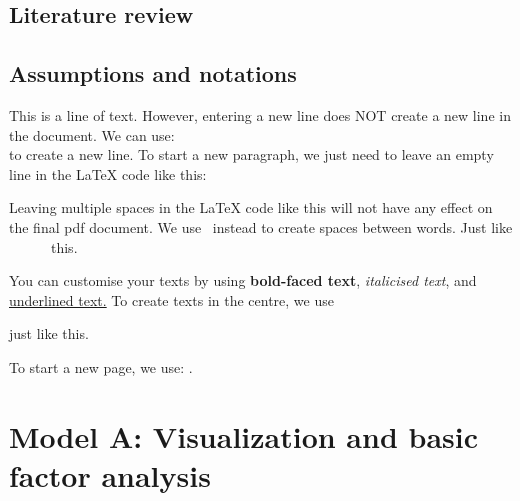 \documentclass[12pt, a4paper]{article}
\begin{document}
\subsection{Literature review}


\subsection{Assumptions and notations}

This is a line of text. However, 
entering a new line does 
NOT create a new line in the document. We can use: \\
to create a new line. To start a new paragraph, we just need to leave an empty line in the LaTeX code like this:

Leaving multiple spaces in the LaTeX code like        this will not have any effect on the final pdf document. We use \ instead to create spaces between words. Just like \ \ \ \ \ \ this.






You can customise your texts by using \textbf{bold-faced text}, \emph{italicised text}, and \underline{underlined text.} To create texts in the centre, we use
\begin{center}
	just like this.
\end{center}

To start a new page, we use: \newpage.

\section{Model A: Visualization and basic factor analysis}
\end{document}
